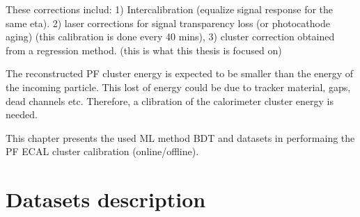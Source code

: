 These corrections includ:
1) Intercalibration (equalize signal response for the same eta).
2) laser corrections for signal transparency loss (or photocathode aging) (this calibration is done every 40 mins),
3) cluster correction obtained from a regression method. (this is what this thesis is focused on)


The reconstructed PF cluster energy is expected to be smaller than the energy of the incoming particle.
This lost of energy could be due to tracker material, gaps, dead channels etc. Therefore, a clibration of the calorimeter cluster energy is needed. 

This chapter presents the used ML method BDT and datasets in performaing the PF ECAL cluster calibration (online/offline).  

\section{Datasets description}


